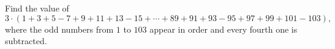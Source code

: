 Find the value of
\[
3\cdot(1+3+5-7+9+11+13-15+\cdots+89+91+93-95+97+99+101-103),
\]
where the odd numbers from $1$ to $103$ appear in order and every fourth one is subtracted.
